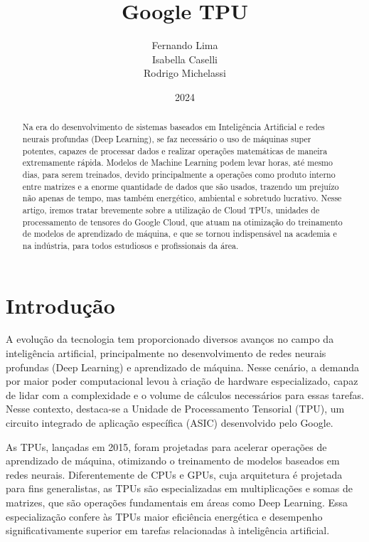 \documentclass{report}
\title{Google TPU}
\author{Fernando Lima \\ Isabella Caselli \\ Rodrigo Michelassi}
\date{2024}
\begin{document}
\maketitle
\tableofcontents	%

\begin{abstract}
Na era do desenvolvimento de sistemas baseados em Inteligência Artificial e redes neurais profundas (Deep Learning), se faz necessário o uso de máquinas super potentes, capazes de processar dados e realizar operações matemáticas de maneira extremamente rápida. Modelos de Machine Learning podem levar horas, até mesmo dias, para serem treinados, devido principalmente a operações como produto interno entre matrizes e a enorme quantidade de dados que são usados, trazendo um prejuízo não apenas de tempo, mas também energético, ambiental e sobretudo lucrativo. Nesse artigo, iremos tratar brevemente sobre a utilização de Cloud TPUs, unidades de processamento de tensores do Google Cloud, que atuam na otimização do treinamento de modelos de aprendizado de máquina, e que se tornou indispensável na academia e na indústria, para todos estudiosos e profissionais da área.
\end{abstract}

\chapter{Introdução}

A evolução da tecnologia tem proporcionado diversos avanços no campo da inteligência artificial, principalmente no desenvolvimento de redes neurais profundas (Deep Learning) e aprendizado de máquina. Nesse cenário, a demanda por maior poder computacional levou à criação de hardware especializado, capaz de lidar com a complexidade e o volume de cálculos necessários para essas tarefas. Nesse contexto, destaca-se a Unidade de Processamento Tensorial (TPU), um circuito integrado de aplicação específica (ASIC) desenvolvido pelo Google.

As TPUs, lançadas em 2015, foram projetadas para acelerar operações de aprendizado de máquina, otimizando o treinamento de modelos baseados em redes neurais. Diferentemente de CPUs e GPUs, cuja arquitetura é projetada para fins generalistas, as TPUs são especializadas em multiplicações e somas de matrizes, que são operações fundamentais em áreas como Deep Learning. Essa especialização confere às TPUs maior eficiência energética e desempenho significativamente superior em tarefas relacionadas à inteligência artificial.
\end{document}
